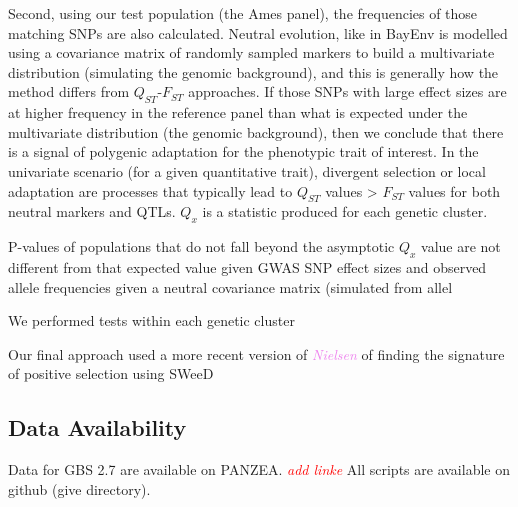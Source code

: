 \documentclass[9pt,twocolumn,twoside]{gsajnl}
\newcommand{\jri}[1]{\textcolor{red}{ \emph{ #1}} }
\newcommand{\kc}[1]{\textcolor{violet}{ \emph{ #1}} }
\begin{document}
Second, using our test population (the Ames panel), the frequencies of those matching SNPs are also calculated. 
Neutral evolution, like in BayEnv is modelled using a covariance matrix of randomly sampled markers to build a multivariate distribution (simulating the genomic background), and this is generally how the method differs from $Q_{ST}$-$F_{ST}$ approaches.
If those SNPs with large effect sizes are at higher frequency in the reference panel than what is expected under the multivariate distribution (the genomic background), then we conclude that there is a signal of polygenic adaptation for the phenotypic trait of interest.
In the univariate scenario (for a given quantitative trait), divergent selection or local adaptation are processes that typically lead to $Q_{ST}$ values > $F_{ST}$ values for both neutral markers and QTLs.
$Q_x$ is a statistic produced for each genetic cluster.

 
P-values of populations that do not fall beyond the asymptotic $Q_x$ value are not different from that expected value given GWAS SNP effect sizes and observed allele frequencies given a neutral covariance matrix (simulated from allel

We performed tests within each genetic cluster

Our final approach used a more recent version of \kc{Nielsen} of finding the signature of positive selection using SWeeD

\subsection*{Data Availability}

Data for GBS 2.7 are available on PANZEA.\jri{add linke} All scripts are available on github (give directory).


\end{document}
